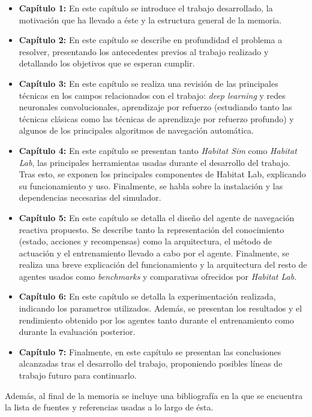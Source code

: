 \begin{itemize}
	\item \textbf{Capítulo 1:} En este capítulo se introduce el trabajo desarrollado, la motivación que ha llevado a éste y la estructura general de la memoria.
	\item \textbf{Capítulo 2:} En este capítulo se describe en profundidad el problema a resolver, presentando los antecedentes previos al trabajo realizado y detallando los objetivos que se esperan cumplir.
	\item \textbf{Capítulo 3:} En este capítulo se realiza una revisión de las principales técnicas en los campos relacionados con el trabajo: \textit{deep learning} y redes neuronales convolucionales, aprendizaje por refuerzo (estudiando tanto las técnicas clásicas como las técnicas de aprendizaje por refuerzo profundo) y algunos de los principales algoritmos de navegación automática.
	\item \textbf{Capítulo 4:} En este capítulo se presentan tanto \textit{Habitat Sim} como \textit{Habitat Lab}, las principales herramientas usadas durante el desarrollo del trabajo. Tras esto, se exponen los principales componentes de Habitat Lab, explicando su funcionamiento y uso. Finalmente, se habla sobre la instalación y las dependencias necesarias del simulador.
	\item \textbf{Capítulo 5:} En este capítulo se detalla el diseño del agente de navegación reactiva propuesto. Se describe tanto la representación del conocimiento (estado, acciones y recompensas) como la arquitectura, el método de actuación y el entrenamiento llevado a cabo por el agente. Finalmente, se realiza una breve explicación del funcionamiento y la arquitectura del resto de agentes usados como \textit{benchmarks} y comparativas ofrecidos por \textit{Habitat Lab}.
	\item \textbf{Capítulo 6:} En este capítulo se detalla la experimentación realizada, indicando los parametros utilizados. Además, se presentan los resultados y el rendimiento obtenido por los agentes tanto durante el entrenamiento como durante la evaluación posterior.
	\item \textbf{Capítulo 7:} Finalmente, en este capítulo se presentan las conclusiones alcanzadas tras el desarrollo del trabajo, proponiendo posibles líneas de trabajo futuro para continuarlo.
\end{itemize}

Además, al final de la memoria se incluye una bibliografía en la que se encuentra la lista de fuentes y referencias usadas a lo largo de ésta.

